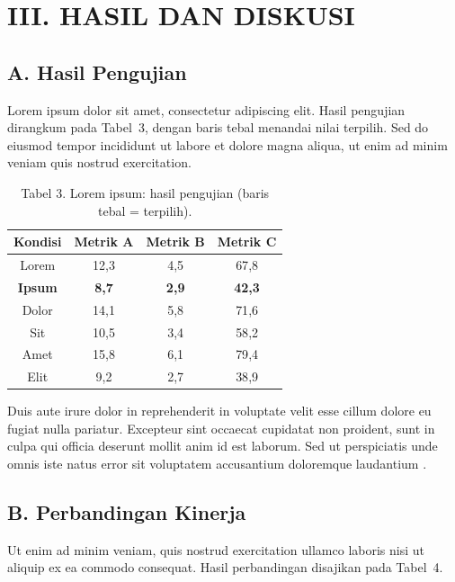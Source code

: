 \section{III. HASIL DAN DISKUSI}

\subsection{A. Hasil Pengujian}

Lorem ipsum dolor sit amet, consectetur adipiscing elit. Hasil pengujian
dirangkum pada Tabel~3, dengan baris tebal menandai nilai terpilih. Sed do
eiusmod tempor incididunt ut labore et dolore magna aliqua, ut enim ad minim
veniam quis nostrud exercitation.

\begin{table}[h]
  \caption{Tabel 3. Lorem ipsum: hasil pengujian (baris tebal = terpilih).}
  \centering
  \begin{tabular}{cccc}
  \hline
  \textbf{Kondisi} & \textbf{Metrik A} & \textbf{Metrik B} & \textbf{Metrik C} \\
  \hline
  Lorem   & 12{,}3  & 4{,}5  & 67{,}8 \\
  \textbf{Ipsum} & \textbf{8{,}7}  & \textbf{2{,}9}  & \textbf{42{,}3} \\
  Dolor   & 14{,}1  & 5{,}8  & 71{,}6 \\
  Sit     & 10{,}5  & 3{,}4  & 58{,}2 \\
  Amet    & 15{,}8  & 6{,}1  & 79{,}4 \\
  Elit    & 9{,}2   & 2{,}7  & 38{,}9 \\
  \hline
  \end{tabular}
\end{table}

Duis aute irure dolor in reprehenderit in voluptate velit esse cillum dolore eu
fugiat nulla pariatur. Excepteur sint occaecat cupidatat non proident, sunt in
culpa qui officia deserunt mollit anim id est laborum. Sed ut perspiciatis unde
omnis iste natus error sit voluptatem accusantium doloremque laudantium
\cite{ContohSatu2024}.

\subsection{B. Perbandingan Kinerja}

Ut enim ad minim veniam, quis nostrud exercitation ullamco laboris nisi ut
aliquip ex ea commodo consequat. Hasil perbandingan disajikan pada Tabel~4.

